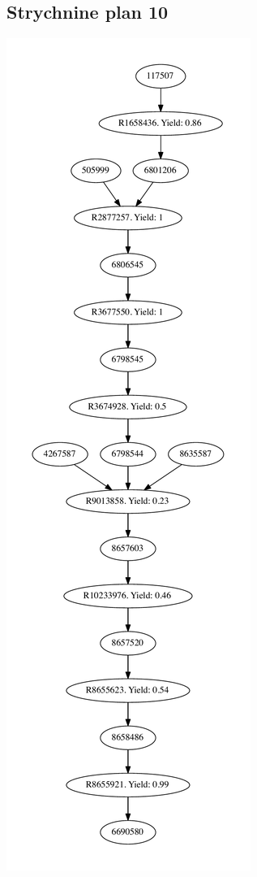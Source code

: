 \documentclass[a4paper,10pt,titlepage]{paper}
\begin{document}
\subsection{Strychnine plan 10}
\centering
\includegraphics[scale=0.4]{Synteseplaner/Strychnine/plan10.pdf}
\label{Appendix::Strychnine10}
\end{document}
